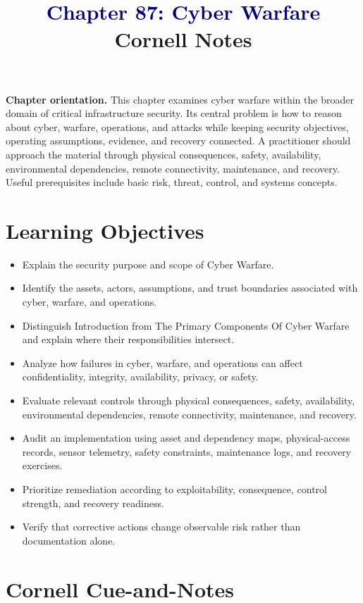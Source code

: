 \documentclass[11pt]{article}
\title{\textcolor{Navy}{Chapter 87: Cyber Warfare}\\[2mm]\large Cornell Notes}
\author{}
\date{}
\begin{document}
\maketitle
\thispagestyle{fancy}
\vspace{-1.5em}
\begin{orientationbox}
\textbf{Chapter orientation.} This chapter examines cyber warfare within the broader domain of critical infrastructure security. Its central problem is how to reason about cyber, warfare, operations, and attacks while keeping security objectives, operating assumptions, evidence, and recovery connected. A practitioner should approach the material through physical consequences, safety, availability, environmental dependencies, remote connectivity, maintenance, and recovery. Useful prerequisites include basic risk, threat, control, and systems concepts.
\end{orientationbox}
\section*{Learning Objectives}
\begin{itemize}
\item Explain the security purpose and scope of Cyber Warfare.
\item Identify the assets, actors, assumptions, and trust boundaries associated with cyber, warfare, and operations.
\item Distinguish Introduction from The Primary Components Of Cyber Warfare and explain where their responsibilities intersect.
\item Analyze how failures in cyber, warfare, and operations can affect confidentiality, integrity, availability, privacy, or safety.
\item Evaluate relevant controls through physical consequences, safety, availability, environmental dependencies, remote connectivity, maintenance, and recovery.
\item Audit an implementation using asset and dependency maps, physical-access records, sensor telemetry, safety constraints, maintenance logs, and recovery exercises.
\item Prioritize remediation according to exploitability, consequence, control strength, and recovery readiness.
\item Verify that corrective actions change observable risk rather than documentation alone.
\end{itemize}
\section*{Cornell Cue-and-Notes}
\end{document}
